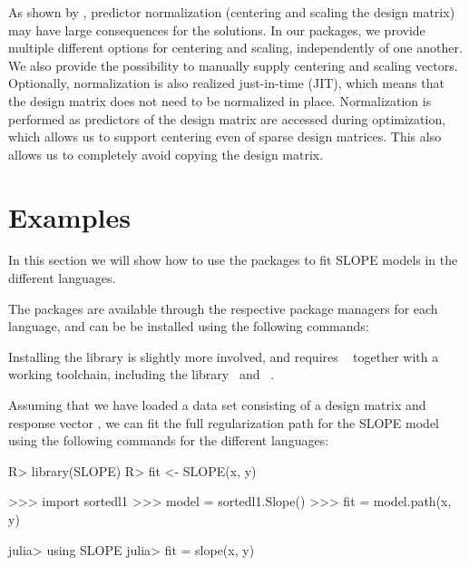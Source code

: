 \documentclass[article]{jss}
\begin{document}
As shown by \citet{larsson2025}, predictor normalization (centering and
scaling the design matrix) may have large consequences for the
solutions. In our packages, we provide multiple different options
for centering and scaling, independently of one another.
We also provide the possibility to manually supply centering
and scaling vectors. Optionally, normalization is also realized just-in-time (JIT),
which means that the design matrix does not need to be normalized in place.
Normalization is performed as predictors of the design matrix are accessed during
optimization, which allows us to support centering even of sparse design
matrices. This also allows us to completely avoid copying the design matrix.

\section{Examples}\label{sec:examples}

In this section we will show how to use the packages to fit SLOPE models in
the different languages.

The packages are
available through the respective package managers for each language, and can be
be installed using the following commands:
\begin{description}[labelwidth=8ex]
  \item[\proglang{R}] 
  \item[\proglang{Python}] 
  \item[\proglang{Julia}] 
\end{description}

Installing the  library is slightly more involved, and requires
~\citep{kitware2025} together with a working  toolchain, including
the  library~\citep{guennebaud2010a} and ~\citep{dagum1998}.

Assuming that we have loaded a data set consisting of a design
matrix  and response vector , we can fit the full regularization
path for the SLOPE model using the following commands for the different languages:

\begin{minipage}[t]{0.25\textwidth}%
  \textbf{}
  \begin{Code}
R> library(SLOPE)
R> fit <- SLOPE(x, y)
  \end{Code}
\end{minipage}
\hfill
\begin{minipage}[t]{0.32\textwidth}

  \textbf{}
  \begin{Code}
>>> import sortedl1
>>> model = sortedl1.Slope()
>>> fit = model.path(x, y)
  \end{Code}
\end{minipage}
\hfill
\begin{minipage}[t]{0.32\textwidth}
  \textbf{}
  \begin{Code}
julia> using SLOPE
julia> fit = slope(x, y)
  \end{Code}
\end{minipage}
\end{document}
